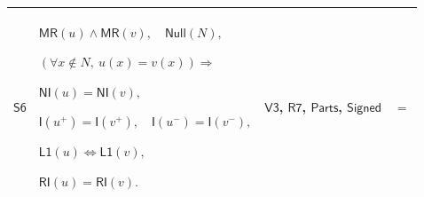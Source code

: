 \documentclass[11pt]{amsart}
\newlength{\FTCOneColumnBody}
\newlength{\FTCFourColumnBody}
\begin{document}
{\begin{tabular}{|@{}>{\centering\arraybackslash}m{\FTCOneColumnBody}|}
\end{tabular}%
\par\setlength{\parskip}{0pt}\nointerlineskip
\noindent
\begin{tabular}{|@{}>{\centering\arraybackslash}m{0.078431\FTCFourColumnBody}|>{\centering\arraybackslash}m{0.535947\FTCFourColumnBody}|>{\centering\arraybackslash}m{0.281045\FTCFourColumnBody}|>{\centering\arraybackslash}m{0.104575\FTCFourColumnBody}|}\hline
\hypertarget{dct:S6}{$\displaystyle \textsf{S6}$} & $\displaystyle \textsf{MR}(u)\land\textsf{MR}(v),\quad\textsf{Null}(N),$\par
$\displaystyle (\forall x\notin N,\ u(x)=v(x))\Rightarrow$\par
$\displaystyle \textsf{NI}(u)=\textsf{NI}(v),$\par
$\displaystyle \textsf{I}(u^+)=\textsf{I}(v^+),\quad\textsf{I}(u^-)=\textsf{I}(v^-),$\par
$\displaystyle \textsf{L1}(u)\Longleftrightarrow\textsf{L1}(v),$\par
$\displaystyle \textsf{RI}(u)=\textsf{RI}(v).$ & \hyperlink{dct:V3}{$\displaystyle \textsf{V3}$}, \hyperlink{dct:R7}{$\displaystyle \textsf{R7}$}, \hyperlink{dctdef:Parts}{$\displaystyle \textsf{Parts}$}, \hyperlink{dctdef:Signed}{$\displaystyle \textsf{Signed}$} & $\displaystyle =$\\ \hline
\end{tabular}%
\par
}
\end{document}
